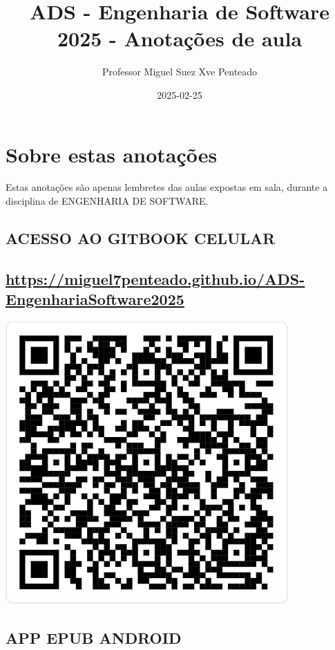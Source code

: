 \documentclass[
]{book}
\title{ADS - Engenharia de Software 2025 - Anotações de aula}
\author{Professor Miguel Suez Xve Penteado}
\date{2025-02-25}
\begin{document}
\maketitle

{
\setcounter{tocdepth}{1}
\tableofcontents
}
\chapter*{Sobre estas anotações}\label{sobre-estas-anotauxe7uxf5es}

Estas anotações são apenas lembretes das aulas expostas em sala, durante a disciplina de ENGENHARIA DE SOFTWARE.

\section{ACESSO AO GITBOOK CELULAR}\label{acesso-ao-gitbook-celular}

\section{\texorpdfstring{\url{https://miguel7penteado.github.io/ADS-EngenhariaSoftware2025}}{https://miguel7penteado.github.io/ADS-EngenhariaSoftware2025}}\label{httpsmiguel7penteado.github.ioads-engenhariasoftware2025}

\includegraphics{images/clipboard-3692082511.png}

\section{APP EPUB ANDROID}\label{app-epub-android}
\end{document}
